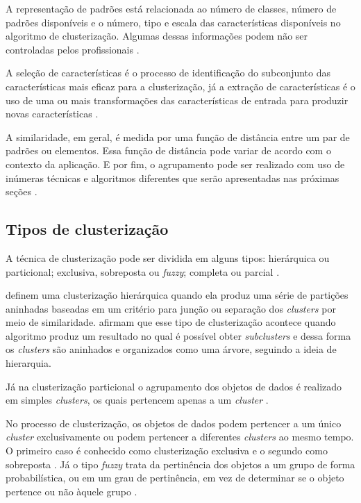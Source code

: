 A representação de padrões está relacionada ao número de classes, número de padrões disponíveis e o número, tipo e escala
das características disponíveis no algoritmo de clusterização. Algumas dessas informações podem não ser controladas pelos
profissionais \cite{clustering_review}.

A seleção de características é o processo de identificação do subconjunto das características mais eficaz para a clusterização, já a extração
de características é o uso de uma ou mais transformações das características de entrada para produzir novas características \cite{clustering_review}.

A similaridade, em geral, é medida por uma função de distância entre um par de padrões ou elementos. 
Essa função de distância pode variar de acordo com o contexto da aplicação. 
E por fim, o agrupamento pode ser realizado com uso de inúmeras técnicas e algoritmos diferentes que serão 
apresentadas nas próximas seções \cite{clustering_review}.

\subsection{Tipos de clusterização}

A técnica de clusterização pode ser dividida em alguns tipos: hierárquica ou particional; exclusiva, sobreposta ou \textit{fuzzy}; completa ou parcial \cite{tan2013data, clustering_review}. 

 definem uma clusterização hierárquica quando ela produz uma série
de partições aninhadas baseadas em um critério para junção ou separação dos \textit{clusters} por meio de similaridade.  afirmam que esse tipo de clusterização acontece quando algoritmo
produz um resultado no qual é possível obter \textit{subclusters} e dessa forma os \textit{clusters} são aninhados
e organizados como uma árvore, seguindo a ideia de hierarquia.

Já na clusterização particional o agrupamento dos objetos de dados é realizado em simples \textit{clusters}, os quais pertencem apenas a um \textit{cluster} \cite{tan2013data}.

No processo de clusterização, os objetos de dados podem pertencer a um único \textit{cluster} exclusivamente ou podem
pertencer a diferentes \textit{clusters} ao mesmo tempo. O primeiro caso é conhecido como clusterização exclusiva e o segundo como sobreposta \cite{tan2013data}. Já o tipo \textit{fuzzy} trata da pertinência dos objetos a um grupo de forma probabilística, ou em um grau de pertinência, em vez de determinar se o objeto pertence ou não àquele grupo \cite{tan2013data, clustering_review}.

